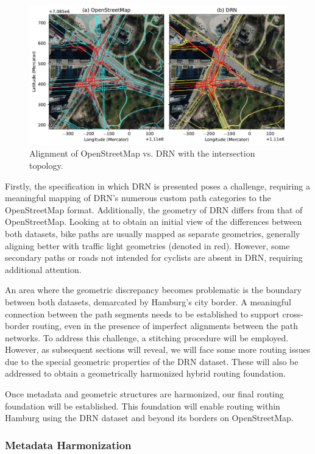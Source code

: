 \begin{figure}[htbp]
\centering
\includegraphics[width=\linewidth]{images/routing-drn-osm-intersection.pdf}
\caption{Alignment of OpenStreetMap vs. DRN with the intersection topology.}
\label{fig:comparison}
\end{figure}

Firstly, the specification in which DRN is presented poses a challenge, requiring a meaningful mapping of DRN's numerous custom path categories to the OpenStreetMap format. Additionally, the geometry of DRN differs from that of OpenStreetMap. Looking at  to obtain an initial view of the differences between both datasets, bike paths are usually mapped as separate geometries, generally aligning better with traffic light geometries (denoted in red). However, some secondary paths or roads not intended for cyclists are absent in DRN, requiring additional attention.

An area where the geometric discrepancy becomes problematic is the boundary between both datasets, demarcated by Hamburg's city border. A meaningful connection between the path segments needs to be established to support cross-border routing, even in the presence of imperfect alignments between the path networks. To address this challenge, a stitching procedure will be employed. However, as subsequent sections will reveal, we will face some more routing issues due to the special geometric properties of the DRN dataset. These will also be addressed to obtain a geometrically harmonized hybrid routing foundation. 

Once metadata and geometric structures are harmonized, our final routing foundation will be established. This foundation will enable routing within Hamburg using the DRN dataset and beyond its borders on OpenStreetMap.

\subsubsection{Metadata Harmonization}


